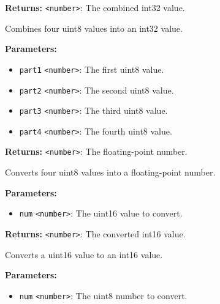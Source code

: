 \documentclass[12pt,a4paper]{article}
\begin{document}
\noindent \textbf{Returns:} \texttt{<number>}: The combined int32 value.

\noindent Combines four uint8 values into an int32 value.

\vspace{5mm}
\noindent {}


\noindent \textbf{Parameters:}
\begin{itemize}
  \item \texttt{part1} \texttt{<number>}: The first uint8 value.
  \item \texttt{part2} \texttt{<number>}: The second uint8 value.
  \item \texttt{part3} \texttt{<number>}: The third uint8 value.
  \item \texttt{part4} \texttt{<number>}: The fourth uint8 value.
\end{itemize}

\noindent \textbf{Returns:} \texttt{<number>}: The floating-point number.

\noindent Converts four uint8 values into a floating-point number.

\vspace{5mm}
\noindent {}


\noindent \textbf{Parameters:}
\begin{itemize}
  \item \texttt{num} \texttt{<number>}: The uint16 value to convert.
\end{itemize}

\noindent \textbf{Returns:} \texttt{<number>}: The converted int16 value.

\noindent Converts a uint16 value to an int16 value.

\vspace{5mm}
\noindent {}


\noindent \textbf{Parameters:}
\begin{itemize}
  \item \texttt{num} \texttt{<number>}: The uint8 number to convert.
\end{itemize}
\end{document}
